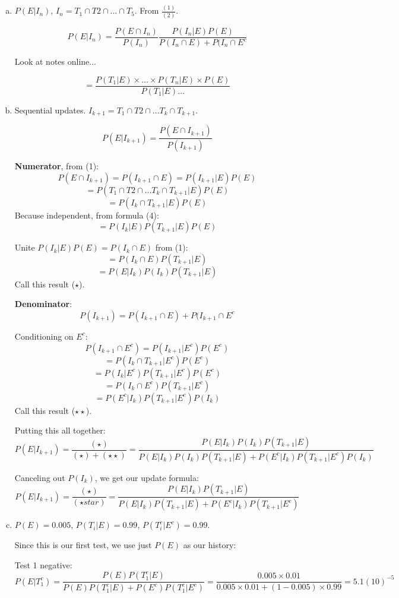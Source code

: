\documentclass{report}
\begin{document}
\begin{enumerate}[(a)]

\item $P(E|I_n)$, $I_n=T_1 \cap T2 \cap \dots \cap T_5$. From $\frac{(1)}{(2)}$.

$$P(E|I_n) = \frac{P(E \cap I_n)}{P(I_n)}  \frac{P(I_n|E) P(E)}{P(I_n \cap E) + P(I_n \cap E^c}$$ 

Look at notes online...

$$ = \frac{P(T_1|E) \times \dots \times P(T_n|E) \times P(E)}{P(T_1|E) \dots } $$

\item Sequential updates. $I_{k+1} = T_1 \cap T2 \cap ... T_k \cap T_{k+1}$.

$$P(E|I_{k+1}) = \frac{P(E \cap I_{k+1})}{P(I_{k+1})}$$

\textbf{Numerator}, from (1): $$ P(E \cap I_{k+1}) = P(I_{k+1} \cap E) = P(I_{k+1}|E)P(E)$$ $$= P(T_1 \cap T2 \cap ... T_k \cap T_{k+1} | E)P(E) $$
$$= P(I_k \cap T_{k+1} | E)P(E) $$
Because independent, from formula (4): $$= P(I_k | E)P(T_{k+1}|E)P(E) $$

Unite $P(I_k|E)P(E) = P(I_k \cap E)$ from (1): $$ = P(I_k \cap E) P(T_{k+1}|E)$$ $$ = P(E | I_k) P(I_k) P(T_{k+1}|E)$$
Call this result ($\star$).

\textbf{Denominator}: $$P(I_{k+1}) = P(I_{k+1} \cap E) + P(I_{k+1} \cap E^c$$

Conditioning on $E^c$:
$$ P(I_{k+1} \cap E^c) = P(I_{k+1}|E^c) P(E^c)$$
$$ = P(I_k \cap T_{k+1} | E^c) P(E^c) $$
$$ = P(I_k | E^c) P(T_{k+1}|E^c) P(E^c)$$
$$ = P(I_k \cap E^c) P(T_{k+1}|E^c)$$
$$ = P(E^c|I_k) P(T_{k+1}|E^c) P(I_k)$$
Call this result ($ \star \star $).

Putting this all together: $$P(E|I_{k+1}) = \frac{(\star)}{(\star) + (\star \star)} = \frac{P(E | I_k) P(I_k) P(T_{k+1}|E)}{P(E | I_k) P(I_k) P(T_{k+1}|E) + P(E^c|I_k) P(T_{k+1}|E^c) P(I_k)}$$

Canceling out $P(I_k)$, we get our update formula: $$P(E|I_{k+1}) = \frac{(\star)}{(\star star)} = \frac{P(E | I_k) P(T_{k+1}|E)}{P(E | I_k) P(T_{k+1}|E) + P(E^c|I_k) P(T_{k+1}|E^c) }$$

\item 

$P(E) = 0.005$, $P(T_i |E ) = 0.99$, $P(T_i^c | E^c) = 0.99$.

Since this is our first test, we use just $P(E)$ as our history:

Test 1 negative: $$  P(E|T_1^c) = \frac{P(E) P(T_1^c|E)}{P(E) P(T_1^c|E) + P(E^c) P(T_1^c |E^c)} = \frac{0.005 \times 0.01}{0.005 \times 0.01 + (1-0.005) \times 0.99} = 5.1(10)^{-5}$$


\end{enumerate}
\end{document}
